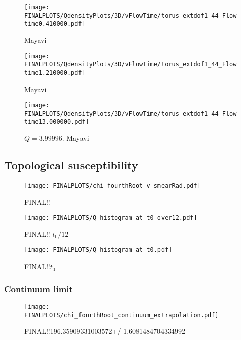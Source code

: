 \documentclass[a4paper,10pt]{article}
\begin{document}
\begin{figure}[H]
\centering
\texttt{[image: FINALPLOTS/QdensityPlots/3D/vFlowTime/torus\_extdof1\_44\_Flowtime0.410000.pdf]}
\caption[]{Mayavi \cite{ramachandran2011mayavi}}\label{fig:PLACEHOLDER}
\end{figure}

\begin{figure}[H]
\centering
\texttt{[image: FINALPLOTS/QdensityPlots/3D/vFlowTime/torus\_extdof1\_44\_Flowtime1.210000.pdf]}
\caption[]{Mayavi \cite{ramachandran2011mayavi}}\label{fig:PLACEHOLDER}
\end{figure}

\begin{figure}[H]
\centering
\texttt{[image: FINALPLOTS/QdensityPlots/3D/vFlowTime/torus\_extdof1\_44\_Flowtime13.000000.pdf]}
\caption[]{$Q = 3.99996$. Mayavi \cite{ramachandran2011mayavi}}\label{fig:PLACEHOLDER}
\end{figure}

\subsection{Topological susceptibility}
\begin{figure}[H]
\centering
\texttt{[image: FINALPLOTS/chi\_fourthRoot\_v\_smearRad.pdf]}
\caption[]{FINAL!!}\label{fig:PLACEHOLDER}
\end{figure}

\begin{figure}[H]
\centering
\texttt{[image: FINALPLOTS/Q\_histogram\_at\_t0\_over12.pdf]}
\caption[]{FINAL!! $t_0/12$}\label{fig:PLACEHOLDER}
\end{figure}

\begin{figure}[H]
\centering
\texttt{[image: FINALPLOTS/Q\_histogram\_at\_t0.pdf]}
\caption[]{FINAL!!$t_0$}\label{fig:PLACEHOLDER}
\end{figure}

\subsubsection{Continuum limit}
\begin{figure}[H]
\centering
\texttt{[image: FINALPLOTS/chi\_fourthRoot\_continuum\_extrapolation.pdf]}
\caption[]{FINAL!!196.35909331003572+/-1.6081484704334992}\label{fig:PLACEHOLDER}
\end{figure}
\end{document}
